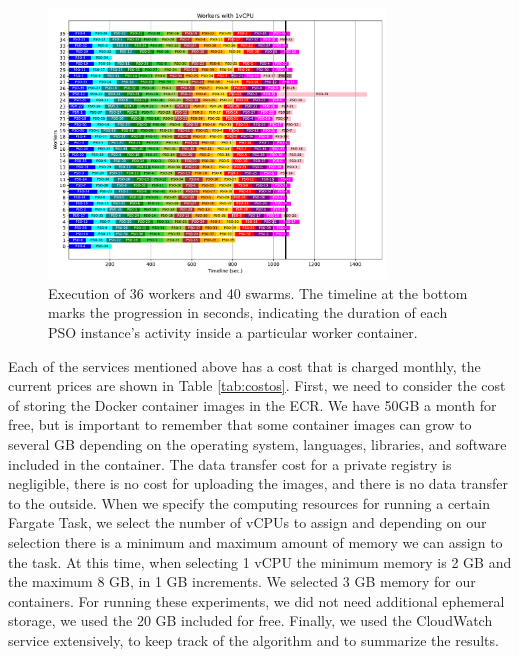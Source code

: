 \documentclass{cys}
\begin{document}
\begin{figure}[h]
\centering
\includegraphics[width=0.8\textwidth]{plotW36P40}
\caption{Execution of 36 workers and 40 swarms. The timeline at the bottom marks 
the progression in seconds, indicating the duration of each PSO instance's activity 
inside a particular worker container.} %
\label{fig:36w40s}
\end{figure}

Each of the services mentioned above has a cost that is charged monthly, the current 
prices are shown in Table \ref{tab:costos}. %
First, we need to consider the cost of storing the Docker container images
in the ECR. We have 50GB a month for free, but is important to remember that
some container images can grow to several GB depending on the 
operating system, languages, libraries, and software included in the container. 
The data transfer cost for a private registry is negligible, there is no cost 
for uploading the images, and there is no data transfer to the outside. 
When we specify the computing resources for running a certain Fargate Task, we
select the number of vCPUs to assign and depending on our selection there
is a minimum and maximum amount of memory we can assign to the task.
At this time, when selecting 1 vCPU the minimum memory is 2 GB and the 
maximum 8 GB, in 1 GB increments. We selected 3 GB memory for our 
containers. For running these experiments, we did not need additional ephemeral storage,
we used the 20 GB included for free. Finally, we used the CloudWatch service extensively,
to keep track of the algorithm and to summarize the results. 
\end{document}
